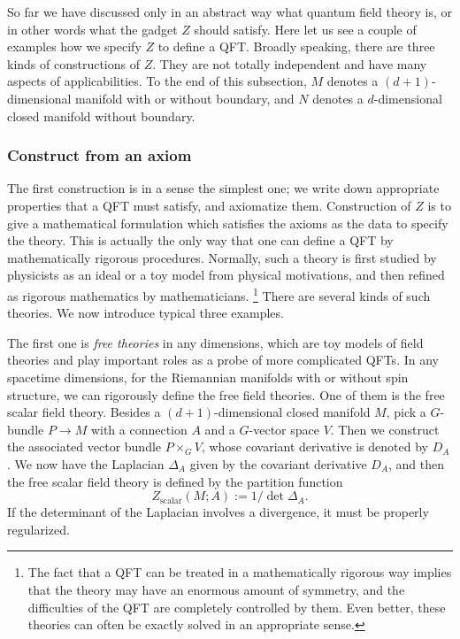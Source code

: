 So far we have discussed only in an abstract way what quantum field
theory is, or in other words what the gadget $Z$ should satisfy.
Here let us see a couple of examples how we specify $Z$ to define a QFT.
Broadly speaking,
there are three kinds of constructions of $Z$. They are not totally
independent and have many aspects of applicabilities. To the end
of this subsection, $M$ denotes a $(d+1)$-dimensional manifold with
or without boundary, and $N$ denotes a $d$-dimensional closed manifold
without boundary.





\subsubsection*{Construct from an axiom}

The first construction is in a sense the simplest one; we write down
appropriate properties that a QFT must satisfy, and axiomatize them.
Construction of $Z$ is to give a mathematical formulation which satisfies
the axioms as the data to specify the theory. This is actually the
only way that one can define a QFT by mathematically rigorous procedures.
Normally, such a theory is first studied by physicists as an ideal
or a toy model from physical motivations, and then refined as rigorous
mathematics by mathematicians.%
%
\footnote{The fact that a QFT can be treated in a mathematically rigorous way
implies that the theory may have an enormous amount of symmetry, and
the difficulties of the QFT are completely controlled by them. Even
better, these theories can often be exactly solved in an appropriate
sense.}
%
There are several kinds of such theories. We now introduce typical
three examples.

The first one is \emph{free theories} in any dimensions, which are
toy models of field theories and play important roles as a probe of
more complicated QFTs. In any spacetime dimensions, for the Riemannian
manifolds with or without spin structure, we can rigorously define
the free field theories. One of them is the free scalar field theory.
Besides a $(d+1)$-dimensional closed manifold $M$, pick a $G$-bundle
$P\to M$ with a connection $A$ and a $G$-vector space $V$.
Then we construct the associated vector bundle $P\times_{G}V$, whose
covariant derivative is denoted by $D_{A}$. We now have the Laplacian
$\Delta_{A}$ given by the covariant derivative $D_{A}$, and then
the free scalar field theory is defined by the partition function
\begin{equation}
  Z_{\mathrm{scalar}}(M;A)  :=  1/\det\Delta_{A}.
\label{eq:Zscalar}
\end{equation}
If the determinant of the Laplacian involves a divergence, it must
be properly regularized.

